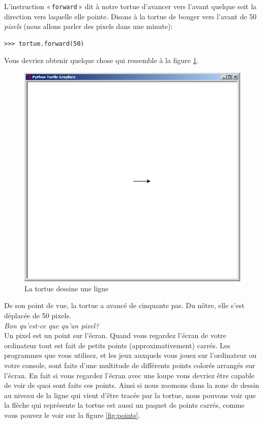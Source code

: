 L'instruction « \texttt{forward} » dit à notre tortue d'avancer vers l'avant quelque soit la direction vers laquelle elle pointe. Disons à la tortue de bouger vers l'avant de 50 \emph{pixels} (nous allons parler des pixels dans une minute):

\begin{Verbatim}[frame=single,rulecolor=\color{mbleu}, label=à taper]
>>> tortue.forward(50)
\end{Verbatim}

Vous devriez obtenir quelque chose qui ressemble à la figure \ref{fig:50px}.

\begin{figure}[!ht]
\centering
\includegraphics[scale=0.4]{images/50px.png}
\caption{La tortue dessine une ligne}
\label{fig:50px}
\end{figure}

De son point de vue, la tortue a avancé de cinquante pas. Du nôtre, elle s'est déplacée  de 50 pixels.\\


\emph{Bon qu'est-ce que qu'un pixel?}\\

Un pixel est un point sur l'écran. Quand vous regardez l'écran de votre ordinateur tout est fait de petits points (approximativement) carrés. Les programmes que vous utilisez, et les jeux auxquels vous jouez sur l'ordinateur ou votre console, sont faits d'une multitude de différents points colorés arrangés sur l'écran. En fait si vous regardez l'écran avec une loupe vous devriez être capable de voir de quoi sont faits ces points. Ainsi si nous zoomons dans la zone de dessin au niveau de la ligne qui vient d'être tracée par la tortue, nous pouvons voir que la flèche qui représente la tortue est aussi un paquet de points carrés, comme vous pouvez le voir sur la figure \ref{fig:points}.

